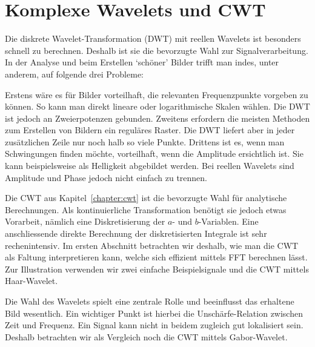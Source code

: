%
%
%

\chapter{Komplexe Wavelets und CWT\label{chapter:complex}}
\begin{refsection}

Die diskrete Wavelet-Transformation (DWT) mit reellen Wavelets ist besonders schnell zu berechnen.
Deshalb ist sie die bevorzugte Wahl zur Signalverarbeitung.
In der Analyse und beim Erstellen `schöner' Bilder trifft man indes, unter anderem, auf folgende drei Probleme:

Erstens wäre es für Bilder vorteilhaft, die relevanten Frequenzpunkte vorgeben zu können.
So kann man direkt lineare oder logarithmische Skalen wählen. Die DWT ist jedoch an Zweierpotenzen gebunden. %
Zweitens erfordern die meisten Methoden zum Erstellen von Bildern ein reguläres Raster.
Die DWT liefert aber in jeder zusätzlichen Zeile nur noch halb so viele Punkte.
Drittens ist es, wenn man Schwingungen finden möchte, vorteilhaft, wenn die Amplitude ersichtlich ist.
Sie kann beispielsweise als Helligkeit abgebildet werden. 
Bei reellen Wavelets sind Amplitude und Phase jedoch nicht einfach zu trennen.

Die CWT aus Kapitel~\ref{chapter:cwt} ist die bevorzugte Wahl für analytische Berechnungen.
Als kontinuierliche Transformation benötigt sie jedoch etwas Vorarbeit,
nämlich eine Diskretisierung der $a$- und $b$-Variablen.
Eine anschliessende direkte Berechnung der diskretisierten Integrale ist sehr rechenintensiv.
Im ersten Abschnitt betrachten wir deshalb, wie man die CWT als Faltung interpretieren kann, welche sich effizient mittels FFT berechnen lässt.
Zur Illustration verwenden wir zwei einfache Beispielsignale und die CWT mittels Haar-Wavelet.

Die Wahl des Wavelets spielt eine zentrale Rolle und beeinflusst das erhaltene Bild wesentlich.
Ein wichtiger Punkt ist hierbei die Unschärfe-Relation zwischen Zeit und Frequenz.
Ein Signal kann nicht in beidem zugleich gut lokalisiert sein.
Deshalb betrachten wir als Vergleich noch die CWT mittels Gabor-Wavelet.


\end{refsection}
